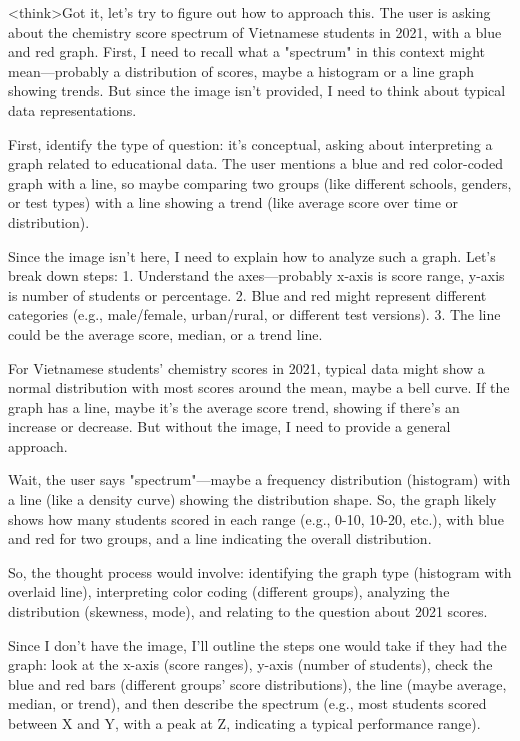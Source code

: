 <think>Got it, let's try to figure out how to approach this. The user is asking about the chemistry score spectrum of Vietnamese students in 2021, with a blue and red graph. First, I need to recall what a "spectrum" in this context might mean—probably a distribution of scores, maybe a histogram or a line graph showing trends. But since the image isn't provided, I need to think about typical data representations. 

First, identify the type of question: it's conceptual, asking about interpreting a graph related to educational data. The user mentions a blue and red color-coded graph with a line, so maybe comparing two groups (like different schools, genders, or test types) with a line showing a trend (like average score over time or distribution). 

Since the image isn't here, I need to explain how to analyze such a graph. Let's break down steps: 1. Understand the axes—probably x-axis is score range, y-axis is number of students or percentage. 2. Blue and red might represent different categories (e.g., male/female, urban/rural, or different test versions). 3. The line could be the average score, median, or a trend line. 

For Vietnamese students' chemistry scores in 2021, typical data might show a normal distribution with most scores around the mean, maybe a bell curve. If the graph has a line, maybe it's the average score trend, showing if there's an increase or decrease. But without the image, I need to provide a general approach. 

Wait, the user says "spectrum"—maybe a frequency distribution (histogram) with a line (like a density curve) showing the distribution shape. So, the graph likely shows how many students scored in each range (e.g., 0-10, 10-20, etc.), with blue and red for two groups, and a line indicating the overall distribution. 

So, the thought process would involve: identifying the graph type (histogram with overlaid line), interpreting color coding (different groups), analyzing the distribution (skewness, mode), and relating to the question about 2021 scores. 

Since I don't have the image, I'll outline the steps one would take if they had the graph: look at the x-axis (score ranges), y-axis (number of students), check the blue and red bars (different groups' score distributions), the line (maybe average, median, or trend), and then describe the spectrum (e.g., most students scored between X and Y, with a peak at Z, indicating a typical performance range). 

